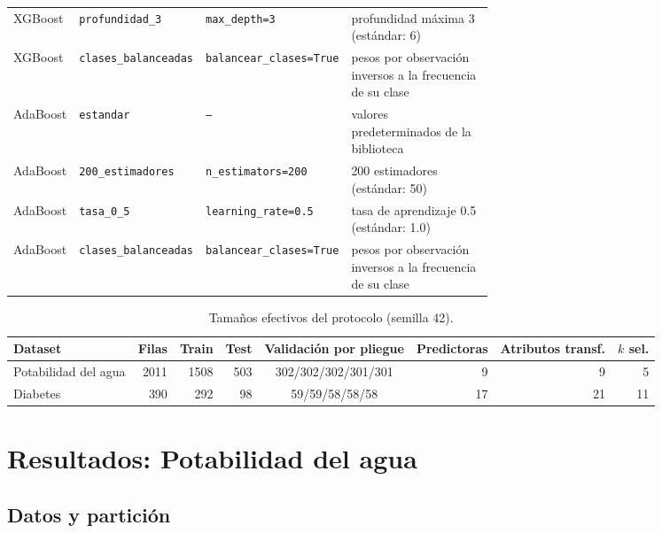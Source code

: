 \documentclass[11pt]{article}
\begin{document}
\begin{table}[H]
\begin{tabular}{llp{0.27\linewidth}p{0.36\linewidth}}
XGBoost & \texttt{profundidad\_\allowbreak{}3} & \texttt{max\_\allowbreak{}depth=3} & profundidad máxima 3 (estándar: 6) \\
XGBoost & \texttt{clases\_\allowbreak{}balanceadas} & \texttt{balancear\_\allowbreak{}clases=True} & pesos por observación inversos a la frecuencia de su clase \\
AdaBoost & \texttt{estandar} & \texttt{--} & valores predeterminados de la biblioteca \\
AdaBoost & \texttt{200\_\allowbreak{}estimadores} & \texttt{n\_\allowbreak{}estimators=200} & 200 estimadores (estándar: 50) \\
AdaBoost & \texttt{tasa\_\allowbreak{}0\_\allowbreak{}5} & \texttt{learning\_\allowbreak{}rate=0.5} & tasa de aprendizaje 0.5 (estándar: 1.0) \\
AdaBoost & \texttt{clases\_\allowbreak{}balanceadas} & \texttt{balancear\_\allowbreak{}clases=True} & pesos por observación inversos a la frecuencia de su clase \\
\bottomrule\end{tabular}
\end{table}

\begin{table}[H]\centering\footnotesize
\caption{Tamaños efectivos del protocolo (semilla 42).}
\begin{tabular}{lrrrcrrr}\toprule
Dataset & Filas & Train & Test & Validación por pliegue & Predictoras & Atributos transf. & $k$ sel. \\ \midrule
Potabilidad del agua & 2011 & 1508 & 503 & 302/302/302/301/301 & 9 & 9 & 5 \\
Diabetes & 390 & 292 & 98 & 59/59/58/58/58 & 17 & 21 & 11 \\
\bottomrule\end{tabular}
\end{table}

\FloatBarrier

\clearpage

\section{Resultados: Potabilidad del agua}

\subsection{Datos y partición}
\end{document}
